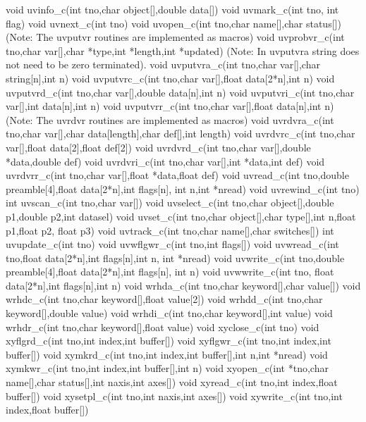 {\ninepoint\begintt
void uvinfo_c(int tno,char object[],double data[])
void uvmark_c(int tno, int flag)
void uvnext_c(int tno)
void uvopen_c(int tno,char name[],char status[])
\endtt}
{\ninepoint\begintt
  (Note: The uvputvr routines are implemented as macros)
void uvprobvr_c(int tno,char var[],char *type,int *length,int *updated)
  (Note: In uvputvra string does not need to be zero terminated).
void uvputvra_c(int tno,char var[],char string[n],int n)
void uvputvrc_c(int tno,char var[],float data[2*n],int n)
void uvputvrd_c(int tno,char var[],double data[n],int n)
void uvputvri_c(int tno,char var[],int data[n],int n)
void uvputvrr_c(int tno,char var[],float data[n],int n)
\endtt}
{\ninepoint\begintt
  (Note: The uvrdvr routines are implemented as macros)
void uvrdvra_c(int tno,char var[],char data[length],char def[],int length)
void uvrdvrc_c(int tno,char var[],float data[2],float def[2])
void uvrdvrd_c(int tno,char var[],double *data,double def)
void uvrdvri_c(int tno,char var[],int *data,int def)
void uvrdvrr_c(int tno,char var[],float *data,float def)
void uvread_c(int tno,double preamble[4],float data[2*n],int flags[n],
     int n,int *nread)
\endtt}
{\ninepoint\begintt
void uvrewind_c(int tno)
int uvscan_c(int tno,char var[])
void uvselect_c(int tno,char object[],double p1,double p2,int datasel)
void uvset_c(int tno,char object[],char type[],int n,float p1,float p2,
     float p3)
void uvtrack_c(int tno,char name[],char switches[])
\endtt}
{\ninepoint\begintt
int uvupdate_c(int tno)
void uvwflgwr_c(int tno,int flags[])
void uvwread_c(int tno,float data[2*n],int flags[n],int n, int *nread)
void uvwrite_c(int tno,double preamble[4],float data[2*n],int flags[n],
     int n)
void uvwwrite_c(int tno, float data[2*n],int flags[n],int n)
\endtt}
{\ninepoint\begintt
void wrhda_c(int tno,char keyword[],char value[])
void wrhdc_c(int tno,char keyword[],float value[2])
void wrhdd_c(int tno,char keyword[],double value)
void wrhdi_c(int tno,char keyword[],int value)
void wrhdr_c(int tno,char keyword[],float value)
\endtt}
{\ninepoint\begintt
void xyclose_c(int tno)
void xyflgrd_c(int tno,int index,int buffer[])
void xyflgwr_c(int tno,int index,int buffer[])
void xymkrd_c(int tno,int index,int buffer[],int n,int *nread)
void xymkwr_c(int tno,int index,int buffer[],int n)
void xyopen_c(int *tno,char name[],char status[],int naxis,int axes[])
void xyread_c(int tno,int index,float buffer[])
void xysetpl_c(int tno,int naxis,int axes[])
void xywrite_c(int tno,int index,float buffer[])
\endtt}
